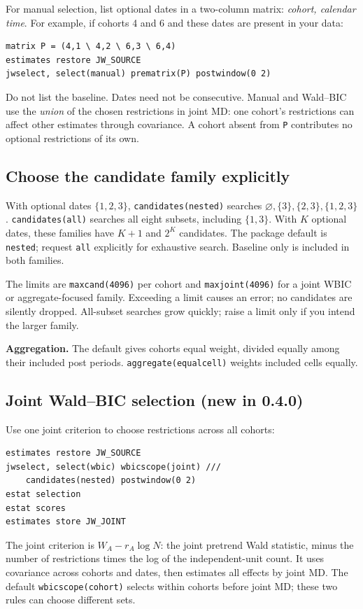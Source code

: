 \documentclass[11pt]{article}
\newcommand{\cmd}[1]{\texttt{#1}}
\begin{document}
For manual selection, list optional dates in a two-column matrix:
\emph{cohort, calendar time}. For example, if cohorts 4 and 6 and these dates
are present in your data:
\begin{lstlisting}
matrix P = (4,1 \ 4,2 \ 6,3 \ 6,4)
estimates restore JW_SOURCE
jwselect, select(manual) prematrix(P) postwindow(0 2)
\end{lstlisting}
Do not list the baseline. Dates need not be consecutive. Manual and Wald--BIC
use the \emph{union} of the chosen restrictions in joint MD: one cohort's
restrictions can affect other estimates through covariance. A cohort absent
from \cmd{P} contributes no optional restrictions of its own.

\subsection*{Choose the candidate family explicitly}
With optional dates $\{1,2,3\}$, \cmd{candidates(nested)} searches
$\varnothing,\{3\},\{2,3\},\{1,2,3\}$.
\cmd{candidates(all)} searches all eight subsets, including $\{1,3\}$.
With $K$ optional dates, these families have $K+1$ and $2^K$ candidates.
The package default is \cmd{nested}; request \cmd{all} explicitly for exhaustive search.
Baseline only is included in both families.

The limits are \cmd{maxcand(4096)} per cohort and \cmd{maxjoint(4096)} for
a joint WBIC or aggregate-focused family. Exceeding a limit causes an error;
no candidates are silently dropped.
All-subset searches grow quickly; raise a limit only if you intend the larger family.

\textbf{Aggregation.} The default gives cohorts equal weight, divided equally
among their included post periods. \cmd{aggregate(equalcell)} weights included
cells equally.

\subsection*{Joint Wald--BIC selection (new in 0.4.0)}
Use one joint criterion to choose restrictions across all cohorts:
\begin{lstlisting}
estimates restore JW_SOURCE
jwselect, select(wbic) wbicscope(joint) ///
    candidates(nested) postwindow(0 2)
estat selection
estat scores
estimates store JW_JOINT
\end{lstlisting}
The joint criterion is $W_A-r_A\log N$: the joint pretrend Wald statistic,
minus the number of restrictions times the log of the independent-unit
count. It uses covariance across cohorts and dates, then estimates all
effects by joint MD. The default \cmd{wbicscope(cohort)} selects within
cohorts before joint MD; these two rules can choose different sets.
\end{document}

